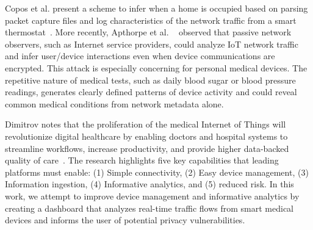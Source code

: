  Copos et al. present a scheme to infer when a home is occupied based on parsing
 packet capture files and log characteristics of the network traffic from a smart thermostat~\cite{coposIoT}.
More recently, Apthorpe et al. ~\cite{apthorpeIoT} observed that passive network observers, such as Internet service providers, could analyze IoT network traffic and infer user/device interactions even when device communications are encrypted. 
This attack is especially concerning for personal medical devices. The repetitive nature of medical tests, such as daily blood sugar or blood pressure readings, generates clearly defined patterns of device activity and could reveal common medical conditions from network metadata alone. 


Dimitrov notes that
the proliferation of the medical Internet of Things will revolutionize digital healthcare
by enabling doctors and hospital systems to streamline workflows, increase productivity,
and provide higher data-backed quality of care~\cite{dimitrovIoT}. The research
highlights five key capabilities that leading platforms must enable: (1) Simple
connectivity, (2) Easy device management, (3) Information ingestion, (4) Informative analytics, and (5) reduced risk. In this work, we attempt to improve device management and informative analytics by creating a dashboard that analyzes real-time traffic flows from smart medical devices and informs the user of potential privacy vulnerabilities.

